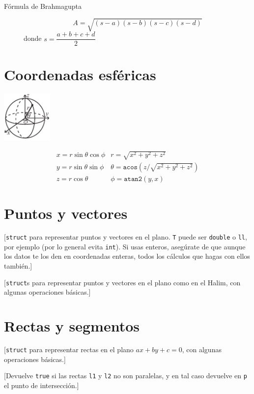 	\begin{description}
		\item[Fórmula de Brahmagupta]
		\[A = \sqrt{(s - a)(s - b)(s - c)(s - d)}\]
		donde $s = \dfrac{a + b + c + d}{2}$
	\end{description}

\section{Coordenadas esféricas}
	\centerline{\includegraphics[width=25mm]{../content/matematicas/sphericalCoordinates}}
	\[\begin{array}{cc}
	x = r\sin\theta\cos\phi & r = \sqrt{x^2+y^2+z^2}\\
	y = r\sin\theta\sin\phi & \theta = \texttt{acos}(z/\sqrt{x^2+y^2+z^2})\\
	z = r\cos\theta & \phi = \texttt{atan2}(y,x)
	\end{array}\]

\section{Puntos y vectores}
		[\texttt{struct} para representar puntos y vectores en el plano. \texttt{T} puede ser \texttt{double} o \texttt{ll}, por ejemplo (por lo general evita \texttt{int}). Si usas enteros, asegúrate de que aunque los datos te los den en coordenadas enteras, todos los cálculos que hagas con ellos también.]
		
		[\texttt{struct}s para representar puntos y vectores en el plano como en el Halim, con algunas operaciones básicas.]

\section{Rectas y segmentos}
		[\texttt{struct} para representar rectas en el plano $ax + by + c = 0$, con algunas operaciones básicas.]
		
		[Devuelve \texttt{true} si las rectas \texttt{l1} y \texttt{l2} no son paralelas, y en tal caso devuelve en \texttt{p} el punto de intersección.]
		
